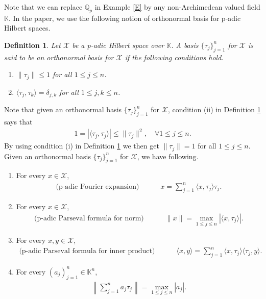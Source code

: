 \documentclass{amsart}
\newtheorem{definition}[theorem]{Definition}
\begin{document}
Note that we can replace $\mathbb{Q}_p$ in Example \ref{E} by any non-Archimedean valued field $\mathbb{K}$. 
In the paper, we use the following notion of orthonormal basis for p-adic Hilbert spaces.
\begin{definition}\label{PONB}
	Let $\mathcal{X}$  be a  p-adic Hilbert  space over $\mathbb{K}$.   A basis  $\{\tau_j\}_{j=1}^n$ for  $\mathcal{X}$ is said to be an  orthonormal basis for    $\mathcal{X}$   if  the following conditions hold.	
		\begin{enumerate}[\upshape(i)]
		\item $\|\tau_j\|\leq 1$ for all $1\leq j\leq n$.
		\item $	\langle \tau_j, \tau_k\rangle =\delta_{j,k}$ for all $ 1\leq j, k \leq n$.
	\end{enumerate}
\end{definition}
 Note that given an orthonormal basis $\{\tau_j\}_{j=1}^n$ for  $\mathcal{X}$,  condition (ii) in Definition \ref{PONB} says that 
 \begin{align*}
 	1=|\langle \tau_j, \tau_j \rangle |\leq \|\tau_j\|^2, \quad \forall 1\leq j \leq n.
 \end{align*}
 By using condition (i) in Definition \ref{PONB} we then get $\|\tau_j\|= 1$ for all $1\leq j\leq n$.
Given an orthonormal basis $\{\tau_j\}_{j=1}^n$ for $\mathcal{X}$, we have following.
	\begin{enumerate}[\upshape(i)]
	\item For every $x \in \mathcal{X}$, 
	\begin{align*}
	\text{(p-adic Fourier expansion)}\quad \quad \quad 	x=\sum_{j=1}^{n}\langle x, \tau_j\rangle  \tau_j.
	\end{align*}
\item For every $x \in \mathcal{X}$, 
	\begin{align*}
	\text{(p-adic Parseval formula for norm)}\quad \quad \quad	\|x\|=\displaystyle \max_{1\leq j\leq n}|\langle x, \tau_j\rangle|.
\end{align*}
\item For every $x, y \in \mathcal{X}$, 
\begin{align*}
	\text{(p-adic Parseval formula for inner product)}\quad \quad \quad	\langle x, y \rangle=\sum_{j=1}^{n}\langle x, \tau_j\rangle\langle \tau_j, y\rangle.
\end{align*}
	\item For every $(a_j)_{j=1}^n \in \mathbb{K}^n$, 
	\begin{align*}
		\left\|\sum_{j=1}^na_j\tau_j \right\|=\displaystyle \max_{1\leq j\leq n}|a_j|.
	\end{align*}
\end{enumerate}
\end{document}
